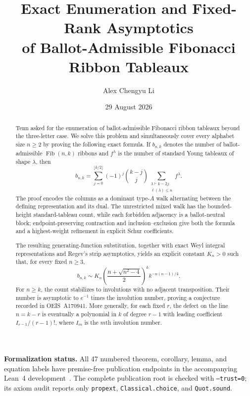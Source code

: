 \documentclass[11pt]{article}
\title{Exact Enumeration and Fixed-Rank Asymptotics\\
of Ballot-Admissible Fibonacci Ribbon Tableaux}
\author{Alex Chengyu Li}
\date{29 August 2026}
\theoremstyle{definition}
\newcommand{\ellp}{\ell}
\begin{document}
\maketitle

\begin{center}
\begin{minipage}{0.88\textwidth}
\textbf{Formalization status.}
All 47 numbered theorem, corollary, lemma, and equation labels have
premise-free publication endpoints in the accompanying Lean~4
development~\cite{LiFibonacciRibbonLean2026}.
The complete publication root is checked with \texttt{--trust=0}; its axiom
audit reports only \texttt{propext}, \texttt{Classical.choice}, and
\texttt{Quot.sound}.
\end{minipage}
\end{center}
\medskip

\begin{abstract}
Tenn asked for the enumeration of ballot-admissible Fibonacci ribbon
tableaux beyond the three-letter case.  We solve this problem and
simultaneously cover every alphabet size $n\ge2$ by proving the following
exact formula.  If $b_{n,k}$ denotes the number of ballot-admissible
$\operatorname{Fib}(n,k)$ ribbons and $f^\lambda$ is the number of standard
Young tableaux of shape $\lambda$, then
\[
 b_{n,k}=\sum_{j=0}^{\lfloor k/2\rfloor}(-1)^j
 \binom{k-j}{j}
 \sum_{\substack{\lambda\vdash k-2j\\\ellp(\lambda)\le n}}f^\lambda.
\]
The proof encodes the columns as a dominant type-$A$ walk alternating between
the defining representation and its dual.  The unrestricted mixed walk has
the bounded-height standard-tableau count, while each forbidden adjacency is
a ballot-neutral block; endpoint-preserving contraction and
inclusion--exclusion give both the formula and a highest-weight refinement in
explicit Schur coefficients.

The resulting generating-function substitution, together with exact Weyl
integral representations and Regev's strip asymptotics, yields an
explicit constant $K_n>0$ such that, for every fixed $n\ge3$,
\[
 b_{n,k}\sim K_n
 \left(\frac{n+\sqrt{n^2-4}}2\right)^k k^{-n(n-1)/4}.
\]
For $n\ge k$, the count stabilizes to involutions with no adjacent
transposition.  Their number is asymptotic to $e^{-1}$ times the involution
number, proving a conjecture recorded in OEIS~A170941.  More generally, for
each fixed $r$, the defect on the line $n=k-r$ is eventually a polynomial in
$k$ of degree $r-1$ with leading coefficient $I_{r-1}/(r-1)!$, where $I_m$
is the $m$th involution number.
\end{abstract}
\end{document}

